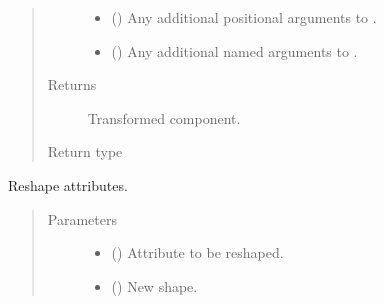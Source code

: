 \documentclass[letterpaper,10pt,english]{sphinxmanual}
\begin{document}
\begin{fulllineitems}
\begin{fulllineitems}
\begin{quote}
\begin{description}
\begin{itemize}
\item {} 
 () \textendash{} Any additional positional arguments to .

\item {} 
 () \textendash{} Any additional named arguments to .

\end{itemize}

\item[{Returns}] \leavevmode
{} \textendash{} Transformed component.

\item[{Return type}] \leavevmode
{\hyperref[\detokenize{api/base_classes:geology.src.base_spatial.SpatialComponent}]{}}

\end{description}\end{quote}

\end{fulllineitems}


\begin{fulllineitems}
\label{\detokenize{api/rock:geology.src.Rock.reshape}}
Reshape  attributes.
\begin{quote}\begin{description}
\item[{Parameters}] \leavevmode\begin{itemize}
\item {} 
 (\sphinxstyleliteralemphasis{\sphinxupquote{, }}) \textendash{} Attribute to be reshaped.

\item {} 
 () \textendash{} New shape.


\end{itemize}
\end{description}
\end{quote}
\end{fulllineitems}
\end{fulllineitems}
\end{document}
